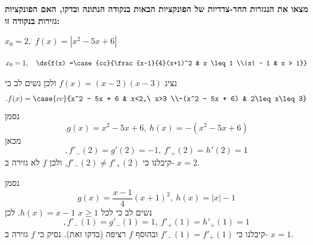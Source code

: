 \textbf{מצאו את הנגזרות החד-צדדיות של הפונקציות הבאות בנקודה הנתונה ובדקו, האם הפונקציות גזירות בנקודה זו:}
\bE{}
\item $x_0 = 2, \,\, f(x) = |x^2 - 5x + 6|$
\item $x_0 = 1, \quad \ds{f(x) =\case{cc}{\frac{x-1}{4}(x+1)^2 & x \leq 1 \\|x| - 1 & x > 1}} $
\eMs\eE

\ifsol
\begin{solbox}
\bE
\item
נציג
$f(x)=(x-2)(x-3)$
ולכן
נשים לב כי
$$.f(x) =\case{cc}{x^2 - 5x + 6 & x<2,\ x>3 \\-(x^2 - 5x + 6) & 2\leq x\leq3}$$
נסמן
$$.g(x)=x^2 - 5x + 6,\ h(x)=-(x^2 - 5x + 6)$$
מכאן
$$,f'_{-}(2)=g'(2)=-1,\ f'_{+}(2)=h'(2)=1$$
קיבלנו כי
$f'_{-}(2)\neq f'_{+}(2)$,
ולכן
$f$
לא גזירה ב-
$x=2$.

\item
נסמן
$$g(x)=\frac{x-1}{4}(x+1)^2,\ h(x)=|x|-1$$
נשים לב כי לכל
$x\geq1$
$h(x)=x-1$.
לכן
$$,f'_{-}(1)=g'_{-}(1)=1,\ f'_{+}(1)=h'_{+}(1)=1$$
קיבלנו כי
$f'_{-}(1)=f'_{+}(1)$
ובהוסף
$f$
רציפה
(בדקו זאת).
נסיק כי
$f$
גזירה ב-
$x=1$.

\eE
\end{solbox}
\fi
